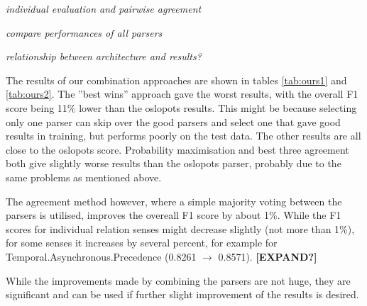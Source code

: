 \documentclass[10pt,notitlepage]{scrartcl}
\begin{document}
\textit{individual evaluation and pairwise agreement}

\textit{compare performances of all parsers}

\textit{relationship between architecture and results?}

The results of our combination approaches are shown in tables \ref{tab:ours1} and \ref{tab:ours2}. The ''best wins'' approach gave the worst results, with the overall F1 score being 11\% lower than the oslopots results. This might be because selecting only one parser can skip over the good parsers and select one that gave good results in training, but performs poorly on the test data. The other results are all close to the oslopots score. Probability maximisation and best three agreement both give slightly worse results than the oslopots parser, probably due to the same problems as mentioned above.

The agreement method however, where a simple majority voting between the parsers is utilised, improves the overeall F1 score by about 1\%. While the F1 scores for individual relation senses might decrease slightly (not more than 1\%), for some senses it increases by several percent, for example for Temporal.Asynchronous.Precedence (0.8261 $\rightarrow$ 0.8571). \textbf{[EXPAND?]}

While the improvements made by combining the parsers are not huge, they are significant and can be used if further slight improvement of the results is desired.
\end{document}

